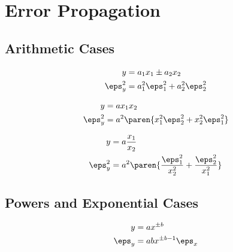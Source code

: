 \chapter{Error Propagation}

\section{Arithmetic Cases}  %

  \begin{equation}   %
   \begin{split}
     y &= a_{1} x_{1} \pm a_{2} x_{2} \\
     \eps_{y}^{2} &=  a_{1}^{2} \eps_{1}^{2} + a_{2}^{2} \eps_{2}^{2}
   \end{split}
  \end{equation}

  \begin{equation}   %
   \begin{split}
     y &= a x_{1} x_{2} \\
     \eps_{y}^{2} &=  a^{2} \paren{ x_{1}^{2} \eps_{2}^{2} + x_{2}^{2} \eps_{1}^{2} }
   \end{split}
  \end{equation}

  \begin{equation}   %
   \begin{split}
     y &= a \frac{x_{1}} {x_{2}} \\
     \eps_{y}^{2} &=  a^{2} \paren{ \frac{\eps_{1}^{2}} {x_{2}^{2}} + \frac{\eps_{2}^{2}} {x_{1}^{2}} }
   \end{split}
  \end{equation}

\section{Powers and Exponential Cases}  %

  \begin{equation}   %
    \begin{split}
      y        &= a x^{\pm b} \\
      \eps_{y} &= a b x^{\pm b - 1} \eps_{x}
    \end{split}
  \end{equation}


